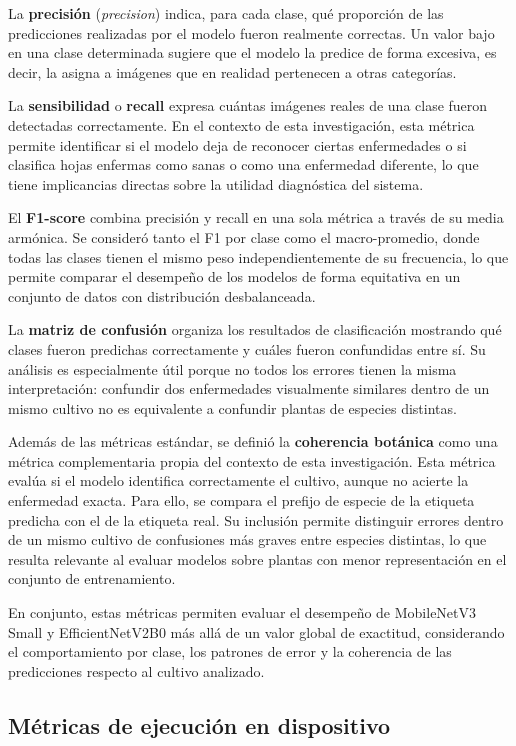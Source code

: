 La \textbf{precisión} (\textit{precision}) indica, para cada clase, qué proporción de las predicciones realizadas por el modelo
fueron realmente correctas. Un valor bajo en una clase determinada sugiere que el modelo la predice de forma excesiva, es decir,
la asigna a imágenes que en realidad pertenecen a otras categorías.

La \textbf{sensibilidad} o \textbf{recall} expresa cuántas imágenes reales de una clase fueron detectadas correctamente. En el
contexto de esta investigación, esta métrica permite identificar si el modelo deja de reconocer ciertas enfermedades o si clasifica
hojas enfermas como sanas o como una enfermedad diferente, lo que tiene implicancias directas sobre la utilidad diagnóstica del
sistema.

El \textbf{F1-score} combina precisión y recall en una sola métrica a través de su media armónica. Se consideró tanto el F1
por clase como el macro-promedio, donde todas las clases tienen el mismo peso independientemente de su frecuencia, lo que permite
comparar el desempeño de los modelos de forma equitativa en un conjunto de datos con distribución desbalanceada.

La \textbf{matriz de confusión} organiza los resultados de clasificación mostrando qué clases fueron predichas correctamente y
cuáles fueron confundidas entre sí. Su análisis es especialmente útil porque no todos los errores tienen la misma interpretación:
confundir dos enfermedades visualmente similares dentro de un mismo cultivo no es equivalente a confundir plantas de especies
distintas.

Además de las métricas estándar, se definió la \textbf{coherencia botánica} como una métrica complementaria propia del contexto
de esta investigación. Esta métrica evalúa si el modelo identifica correctamente el cultivo, aunque no acierte la enfermedad
exacta. Para ello, se compara el prefijo de especie de la etiqueta predicha con el de la etiqueta real. Su inclusión permite
distinguir errores dentro de un mismo cultivo de confusiones más graves entre especies distintas, lo que resulta relevante al
evaluar modelos sobre plantas con menor representación en el conjunto de entrenamiento.

En conjunto, estas métricas permiten evaluar el desempeño de MobileNetV3 Small y EfficientNetV2B0 más allá de un valor global
de exactitud, considerando el comportamiento por clase, los patrones de error y la coherencia de las predicciones respecto al
cultivo analizado.


\subsection{Métricas de ejecución en dispositivo}

